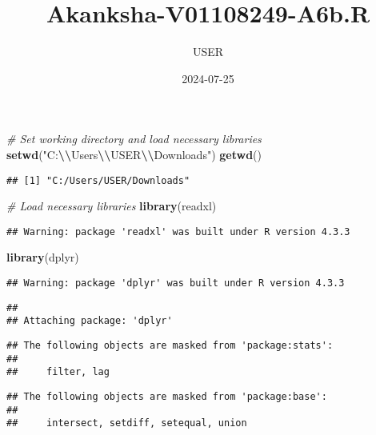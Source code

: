 \documentclass[
]{article}
\title{Akanksha-V01108249-A6b.R}
\author{USER}
\date{2024-07-25}
\newenvironment{Shaded}{\begin{snugshade}}{\end{snugshade}}
\newcommand{\CommentTok}[1]{\textcolor[rgb]{0.56,0.35,0.01}{\textit{#1}}}
\newcommand{\FunctionTok}[1]{\textcolor[rgb]{0.13,0.29,0.53}{\textbf{#1}}}
\newcommand{\NormalTok}[1]{#1}
\newcommand{\SpecialCharTok}[1]{\textcolor[rgb]{0.81,0.36,0.00}{\textbf{#1}}}
\newcommand{\StringTok}[1]{\textcolor[rgb]{0.31,0.60,0.02}{#1}}
\begin{document}
\maketitle

\begin{Shaded}
\begin{Highlighting}[]
\CommentTok{\# Set working directory and load necessary libraries}
\FunctionTok{setwd}\NormalTok{(}\StringTok{"C:}\SpecialCharTok{\textbackslash{}\textbackslash{}}\StringTok{Users}\SpecialCharTok{\textbackslash{}\textbackslash{}}\StringTok{USER}\SpecialCharTok{\textbackslash{}\textbackslash{}}\StringTok{Downloads"}\NormalTok{)}
\FunctionTok{getwd}\NormalTok{()}
\end{Highlighting}
\end{Shaded}

\begin{verbatim}
## [1] "C:/Users/USER/Downloads"
\end{verbatim}

\begin{Shaded}
\begin{Highlighting}[]
\CommentTok{\# Load necessary libraries}
\FunctionTok{library}\NormalTok{(readxl)}
\end{Highlighting}
\end{Shaded}

\begin{verbatim}
## Warning: package 'readxl' was built under R version 4.3.3
\end{verbatim}

\begin{Shaded}
\begin{Highlighting}[]
\FunctionTok{library}\NormalTok{(dplyr)}
\end{Highlighting}
\end{Shaded}

\begin{verbatim}
## Warning: package 'dplyr' was built under R version 4.3.3
\end{verbatim}

\begin{verbatim}
## 
## Attaching package: 'dplyr'
\end{verbatim}

\begin{verbatim}
## The following objects are masked from 'package:stats':
## 
##     filter, lag
\end{verbatim}

\begin{verbatim}
## The following objects are masked from 'package:base':
## 
##     intersect, setdiff, setequal, union
\end{verbatim}
\end{document}
